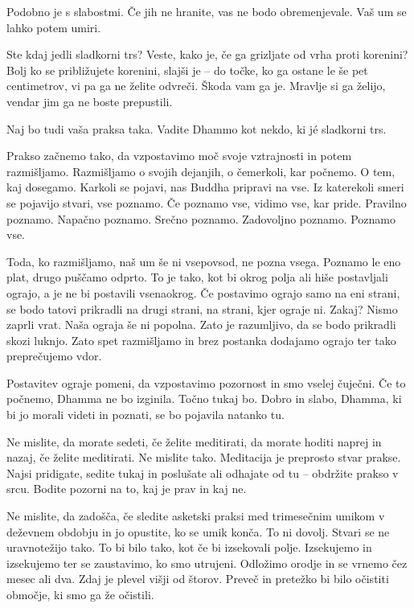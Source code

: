 Podobno je s slabostmi. Če jih ne hranite, vas ne bodo obremenjevale. Vaš um se lahko potem umiri.


Ste kdaj jedli sladkorni trs? Veste, kako je, če ga grizljate od vrha proti korenini? Bolj ko se približujete korenini, slajši je – do točke, ko ga ostane le še pet centimetrov, vi pa ga ne želite odvreči. Škoda vam ga je. Mravlje si ga želijo, vendar jim ga ne boste prepustili.

Naj bo tudi vaša praksa taka. Vadite Dhammo kot nekdo, ki jé sladkorni trs.

\clearpage


Prakso začnemo tako, da vzpostavimo moč svoje vztrajnosti in potem razmišljamo. Razmišljamo o svojih dejanjih, o čemerkoli, kar počnemo. O tem, kaj dosegamo. Karkoli se pojavi, nas Buddha pripravi na vse. Iz katerekoli smeri se pojavijo stvari, vse poznamo. Če poznamo vse, vidimo vse, kar pride. Pravilno poznamo. Napačno poznamo. Srečno poznamo. Zadovoljno poznamo. Poznamo vse.

Toda, ko razmišljamo, naš um še ni vsepovsod, ne pozna vsega. Poznamo le eno plat, drugo puščamo odprto. To je tako, kot bi okrog polja ali hiše postavljali ograjo, a je ne bi postavili vsenaokrog. Če postavimo ograjo samo na eni strani, se bodo tatovi prikradli na drugi strani, na strani, kjer ograje ni. Zakaj? Nismo zaprli vrat. Naša ograja še ni popolna. Zato je razumljivo, da se bodo prikradli skozi luknjo. Zato spet razmišljamo in brez postanka dodajamo ograjo ter tako preprečujemo vdor.

Postavitev ograje pomeni, da vzpostavimo pozornost in smo vselej čuječni. Če to počnemo, Dhamma ne bo izginila. Točno tukaj bo. Dobro in slabo, Dhamma, ki bi jo morali videti in poznati, se bo pojavila natanko tu.

\clearpage


Ne mislite, da morate sedeti, če želite meditirati, da morate hoditi naprej in nazaj, če želite meditirati. Ne mislite tako. Meditacija je preprosto stvar prakse. Najsi pridigate, sedite tukaj in poslušate ali odhajate od tu – obdržite prakso v srcu. Bodite pozorni na to, kaj je prav in kaj ne.

Ne mislite, da zadošča, če sledite asketski praksi med trimesečnim umikom v deževnem obdobju in jo opustite, ko se umik konča. To ni dovolj. Stvari se ne uravnotežijo tako. To bi bilo tako, kot če bi izsekovali polje. Izsekujemo in izsekujemo ter se zaustavimo, ko smo utrujeni. Odložimo orodje in se vrnemo čez mesec ali dva. Zdaj je plevel višji od štorov. Preveč in pretežko bi bilo očistiti območje, ki smo ga že očistili.

